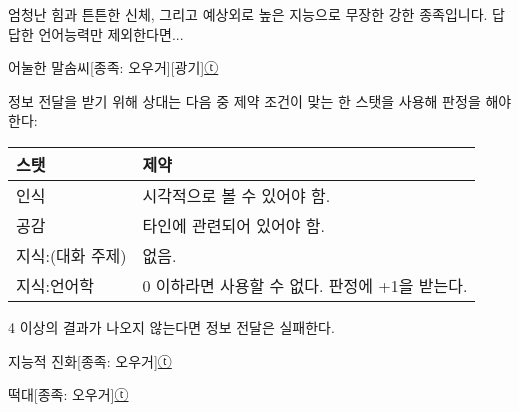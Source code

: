 \documentclass{report}
\begin{document}
	엄청난 힘과 튼튼한 신체, 그리고 예상외로 높은 지능으로 무장한 강한 종족입니다. 답답한 언어능력만 제외한다면...
	
	\begin{story}{어눌한 말솜씨}{[종족: 오우거][광기]\hyperlink{celesteela}{ⓣ}}
		{정보 전달을 받기 위해 상대는 다음 중 제약 조건이 맞는 한 스탯을 사용해 판정을 해야한다:
			
			\begin{tightcenter}
				\begin{tabular}{l|l}
					\textbf{스탯}    & \textbf{제약}                                  \\\hline\hline
					인식             & 시각적으로 볼 수 있어야 함.                    \\\hline
					공감             & 타인에 관련되어 있어야 함.                     \\\hline
					지식:(대화 주제) & 없음.                                          \\\hline
					지식:언어학      & 0 이하라면 사용할 수 없다. 판정에 +1을 받는다.
				\end{tabular}
			\end{tightcenter}
			
			4 이상의 결과가 나오지 않는다면 정보 전달은 실패한다.}
		
		
	\end{story}
	
	\begin{story}{지능적 진화}{[종족: 오우거]\hyperlink{celesteela}{ⓣ}}
		
	\end{story}
	
	\begin{story}{떡대}{[종족: 오우거]\hyperlink{celesteela}{ⓣ}}
		
		
		
	\end{story}
\end{document}
